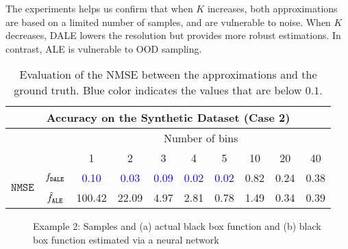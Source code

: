 The experiments helps us confirm that when \(K \) increases, both
approximations are based on a limited number of samples, and are
vulnerable to noise. When \(K\) decreases, DALE lowers the resolution
but provides more robust estimations. In contrast, ALE is vulnerable
to OOD sampling.

\begin{table}
  \centering
  \caption{Evaluation of the NMSE between the approximations and the ground truth. Blue color indicates the values that are below \(0.1\).}
  \label{tab:case-2-accuracy}
  \begin{tabular}{c|c|c|c|c|c|c|c|c|c}
    \multicolumn{10}{c}{Accuracy on the Synthetic Dataset (Case 2)} \\
    \hline \hline
    & & \multicolumn{8}{|c}{Number of bins} \\
    \hline
    & & 1 & 2 & 3 & 4 & 5 & 10 & 20 & 40 \\
    \hline
    \hline
    \multirow{2}{*}{\(\mathtt{NMSE}\)} & \(f_{\mathtt{DALE}}\) & \textcolor{blue}{0.10} & \textcolor{blue}{0.03} & \textcolor{blue}{0.09} & \textcolor{blue}{0.02} & \textcolor{blue}{0.02} & 0.82 & 0.24 & 0.38\\
    & \(\hat{f}_{\mathtt{ALE}}\) & 100.42 & 22.09 & 4.97 & 2.81 & 0.78 & 1.49 & 0.34 & 0.39 \\
    \hline
  \end{tabular}
\end{table}


\begin{figure}[h]
  \begin{center}
    \resizebox{.33\columnwidth}{!}{}
    \resizebox{.32\columnwidth}{!}{}
    \resizebox{.32\columnwidth}{!}{}
  \end{center}
  \caption[Example 2]{Example 2: Samples and (a) actual black box function and
    (b) black box function estimated via a neural network}
  \label{fig:example-2-samples}
\end{figure}

